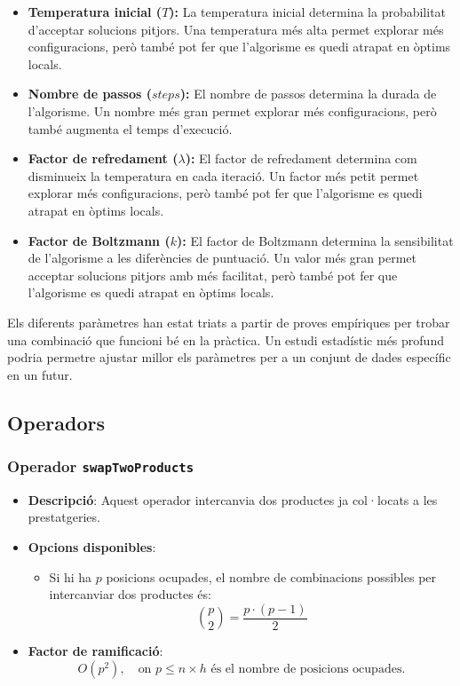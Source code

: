\documentclass[a4paper,12pt]{report}
\begin{document}
\begin{itemize}
\begin{itemize}
	\item \textbf{Temperatura inicial (\(T\)):} La temperatura inicial determina la probabilitat d'acceptar solucions pitjors. Una temperatura més alta permet explorar més configuracions, però també pot fer que l'algorisme es quedi atrapat en òptims locals. 
	\item \textbf{Nombre de passos (\(steps\)):} El nombre de passos determina la durada de l'algorisme. Un nombre més gran permet explorar més configuracions, però també augmenta el temps d'execució. 
	\item \textbf{Factor de refredament (\(\lambda\)):} El factor de refredament determina com disminueix la temperatura en cada iteració. Un factor més petit permet explorar més configuracions, però també pot fer que l'algorisme es quedi atrapat en òptims locals. 
	\item \textbf{Factor de Boltzmann (\(k\)):} El factor de Boltzmann determina la sensibilitat de l'algorisme a les diferències de puntuació. Un valor més gran permet acceptar solucions pitjors amb més facilitat, però també pot fer que l'algorisme es quedi atrapat en òptims locals. 
\end{itemize}

Els diferents paràmetres han estat triats a partir de proves empíriques per trobar una combinació que funcioni bé en la pràctica. Un estudi estadístic més profund podria permetre ajustar millor els paràmetres per a un conjunt de dades específic en un futur.

\subsection {Operadors}

\subsubsection{Operador \texttt{swapTwoProducts}}
\begin{itemize}
    \item \textbf{Descripció}: Aquest operador intercanvia dos productes ja col·locats a les prestatgeries.
    \item \textbf{Opcions disponibles}: 
    \begin{itemize}
        \item Si hi ha \(p\) posicions ocupades, el nombre de combinacions possibles per intercanviar dos productes és:
        \[
        \binom{p}{2} = \frac{p \cdot (p - 1)}{2}
        \]
    \end{itemize}
    \item \textbf{Factor de ramificació}:
    \[
    O(p^2), \quad \text{on } p \leq n \times h \text{ és el nombre de posicions ocupades.}
    \]
\end{itemize}


\end{itemize}
\end{document}
